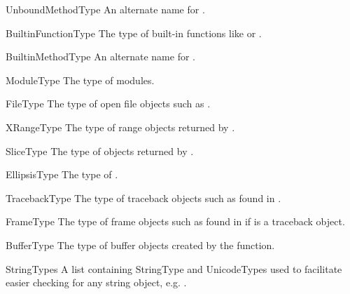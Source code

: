 \begin{datadesc}{UnboundMethodType}
An alternate name for .
\end{datadesc}

\begin{datadesc}{BuiltinFunctionType}
The type of built-in functions like  or
.
\end{datadesc}

\begin{datadesc}{BuiltinMethodType}
An alternate name for .
\end{datadesc}

\begin{datadesc}{ModuleType}
The type of modules.
\end{datadesc}

\begin{datadesc}{FileType}
The type of open file objects such as .
\end{datadesc}

\begin{datadesc}{XRangeType}
The type of range objects returned by
.
\end{datadesc}

\begin{datadesc}{SliceType}
The type of objects returned by
.
\end{datadesc}

\begin{datadesc}{EllipsisType}
The type of .
\end{datadesc}

\begin{datadesc}{TracebackType}
The type of traceback objects such as found in
.
\end{datadesc}

\begin{datadesc}{FrameType}
The type of frame objects such as found in  if
 is a traceback object.
\end{datadesc}

\begin{datadesc}{BufferType}
The type of buffer objects created by the
 function.
\end{datadesc}

\begin{datadesc}{StringTypes}
A list containing StringType and UnicodeTypes used to facilitate easier
checking for any string object, e.g. .
\end{datadesc}
